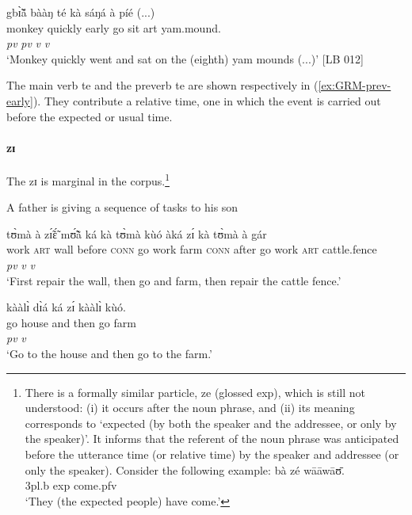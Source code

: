 \begin{exe}
\begin{exe}
\begin{exe}
\begin{exe}
\begin{exe}
\begin{exe}
\begin{exe}
\begin{exe}
\begin{exe}
\begin{exe}
\begin{exe}
\begin{exe}
\ex\label{GRM-prev-SVC-ka-1}
\glll gbɪ̃̀ã́     bààŋ   té   kà     sáŋá   à   
píé  {(...)}\\
monkey quickly   early   go  sit {\sc art}
yam.mound.{\pl}   {}\\
{} {\it pv} {\it pv}  {\it v} {\it v} {}  {} {}\\
\glt `Monkey quickly went and sat on the (eighth) yam mounds (...)'  [LB 012]
\z
\z

The main verb {\sls te} and the preverb {\sls te} are shown respectively in  (\ref{ex:GRM-prev-early}).  They contribute a relative time, one in which the event is carried out before the expected or usual time. 


\paragraph{zɪ}
\label{sec:GRM-preverb-after-then}

The  {\sls zɪ} is marginal in the corpus.\footnote{There is a formally similar particle, {\sls ze}  (glossed {\sc exp}),  which is still not understood: (i) it occurs after the noun phrase, and  (ii) its meaning corresponds to `expected (by both the speaker and the addressee, or only by the speaker)'. It informs that the referent of the noun phrase was anticipated before the utterance time (or relative time) by the speaker and addressee (or only the speaker).  Consider  the following example:
\ea
\gll bà zé  wāāwāʊ̄.\\
{\sc 3pl.b} {\sc  exp} come.{\sc pfv}\\
\glt  `They (the expected people) have come.'
\z  
}

\ea
\ea\label{ex:GRM-prev-zi-1}  {\rm A father is giving a sequence of tasks to
his son}

 \glll tʊ̀mà  à  zɪ̃́ɛ̃́  mʊ̃́ã̀  ká  kà  tʊ̀mà  kùó   àká   zɪ́ kà  
tʊ̀mà à  gár\\
  {work} \textsc{art} {wall} {before}  \textsc{conn} go {work}
{farm} 
\textsc{conn} {after}  {go} {work} \textsc{art} {cattle.fence}\\
{} {} {} {} {}  {} {} {} {} {\it pv} {\it v} {\it v} {} {}\\ 
\glt  `First repair the wall, then go and farm, then repair the cattle fence.'


 \ex\label{ex:GRM-prev-zi-2}
  \glll kààlɪ̀ dɪ̀á ká zɪ́ kààlɪ̀ kùó.\\
go  house and then go farm\\
{} {} {}  {\it pv} {\it v} {}\\
 \glt `Go to the house and then go to the farm.'



\end{exe}
\end{exe}
\end{exe}
\end{exe}
\end{exe}
\end{exe}
\end{exe}
\end{exe}
\end{exe}
\end{exe}
\end{exe}
\end{exe}
